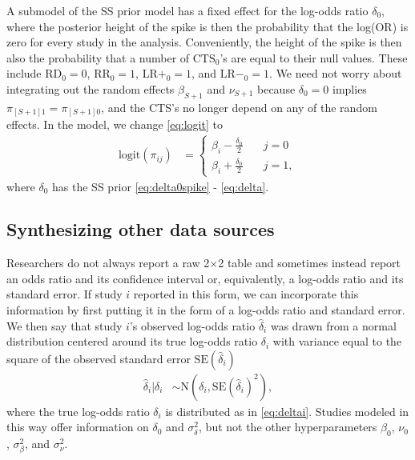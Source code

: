 \documentclass[AMA,STIX1COL]{WileyNJD-v2}
\begin{document}
A submodel of the SS prior model has a fixed effect for the log-odds ratio $\delta_0$, where the posterior height of the spike is then the probability that the log(OR) is zero for every study in the analysis. Conveniently, the height of the spike is then also the probability that a number of $\mbox{CTS}_0$'s are equal to their null values. These include $\mbox{RD}_0 = 0$, $\mbox{RR}_0 = 1$, $\mbox{LR}+_0 = 1$, and $\mbox{LR}-_0 = 1$. We need not worry about integrating out the random effects $\beta_{S+1}$ and $\nu_{S+1}$ because $\delta_0 = 0$ implies $\pi_{[S+1]1} = \pi_{[S+1]0}$, and the CTS's no longer depend on any of the random effects. In the model, we change \eqref{eq:logit} to 
\begin{align}
\mbox{logit}(\pi_{ij}) & =  \left\{
                  \begin{array}{ll}
                    \beta_{i} - \frac{\delta_0}{2} & \quad j=0 \\ 
                    \beta_{i} + \frac{\delta_0}{2} & \quad j=1,
                  \end{array}
                \right. \label{eq:fixed_logit}
\end{align}
where $\delta_0$ has the SS prior \eqref{eq:delta0spike} - \eqref{eq:delta}.

\subsection{Synthesizing other data sources} \label{sec:synthesis}

Researchers do not always report a raw 2$\times$2 table and sometimes instead report an odds ratio and its confidence interval or, equivalently, a log-odds ratio and its standard error. If study $i$ reported in this form, we can incorporate this information by first putting it in the form of a log-odds ratio and standard error. We then say that study $i$'s observed log-odds ratio $\hat{\delta}_i$ was drawn from a normal distribution centered around its true log-odds ratio $\delta_i$ with variance equal to the square of the observed standard error $\mbox{SE}(\hat{\delta}_i)$
\begin{align}
\hat{\delta}_i \vert \delta_i &\sim \mbox{N}(\delta_i, \mbox{SE}(\hat{\delta}_i)^2), \label{eq:deltahat} 
\end{align}
where the true log-odds ratio $\delta_i$ is distributed as in \eqref{eq:deltai}. Studies modeled in this way offer information on $\delta_0$ and $\sigma^2_\delta$, but not the other hyperparameters $\beta_0$, $\nu_0$, $\sigma^2_\beta$, and $\sigma^2_\nu$. 
\end{document}

